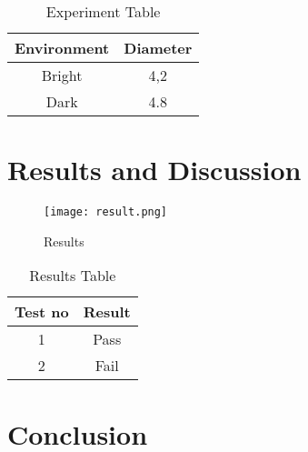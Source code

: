 \documentclass[20,twocolumn]{article}
\begin{document}
\begin{table}[h]
    \centering
    \begin{tabular}{|c|c|}
         \hline
         Environment & Diameter \\
         \hline
         Bright & 4,2\\
         \hline
         Dark & 4.8\\
         \hline
    \end{tabular}
    \caption{Experiment Table}
    \label{tab2}
\end{table}

\section{Results and Discussion}
\lipsum[3]
\begin{figure}[h]
    \centering
    \texttt{[image: result.png]}
    \caption{Results}
    \label{img3}
\end{figure}

\begin{table}[h]
    \centering
    \begin{tabular}{|c|c|}
         \hline
         Test no & Result \\
         \hline
         1 & Pass\\
         \hline
         2 & Fail\\
         \hline
    \end{tabular}
    \caption{Results Table}
    \label{tab3}
\end{table}


\section{Conclusion}
\lipsum[6]

\end{document}
